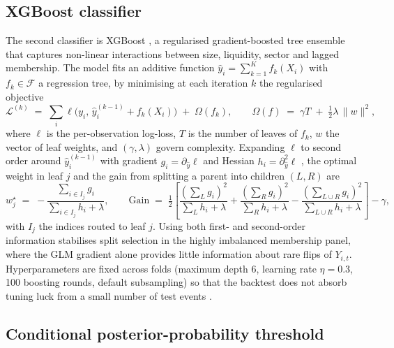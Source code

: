 \subsection{XGBoost classifier}

The second classifier is XGBoost \parencite{xgboost-a-scaleable-tree-boosting-system}, a regularised gradient-boosted tree ensemble that captures non-linear interactions between size, liquidity, sector and lagged membership. The model fits an additive function $\hat{y}_i=\sum_{k=1}^{K} f_k(X_i)$ with $f_k\in\mathcal{F}$ a regression tree, by minimising at each iteration $k$ the regularised objective
\begin{equation}
\mathcal{L}^{(k)} \;=\; \sum_{i}\ell\!\big(y_i,\,\hat{y}_i^{(k-1)}+f_k(X_i)\big) \;+\; \Omega(f_k),
\qquad
\Omega(f)\;=\;\gamma T \;+\; \tfrac{1}{2}\lambda\,\lVert w\rVert^{2},
\label{eq:xgb-obj}
\end{equation}
where $\ell$ is the per-observation log-loss, $T$ is the number of leaves of $f_k$, $w$ the vector of leaf weights, and $(\gamma,\lambda)$ govern complexity. Expanding $\ell$ to second order around $\hat{y}_i^{(k-1)}$ with gradient $g_i=\partial_{\hat{y}}\ell$ and Hessian $h_i=\partial^{2}_{\hat{y}}\ell$ \parencite{friedman-greedy-function-approximation,friedman-additive-logistic-regression}, the optimal weight in leaf $j$ and the gain from splitting a parent into children $(L,R)$ are
\begin{equation}
w_{j}^{\star} \;=\; -\frac{\sum_{i\in I_j} g_i}{\sum_{i\in I_j} h_i + \lambda},
\qquad
\mathrm{Gain} \;=\; \tfrac{1}{2}\!\left[\frac{(\sum_{L} g_i)^2}{\sum_{L} h_i + \lambda} + \frac{(\sum_{R} g_i)^2}{\sum_{R} h_i + \lambda} - \frac{(\sum_{L\cup R} g_i)^2}{\sum_{L\cup R} h_i + \lambda}\right] - \gamma,
\label{eq:xgb-leaf}
\end{equation}
with $I_j$ the indices routed to leaf $j$. Using both first- and second-order information stabilises split selection in the highly imbalanced membership panel, where the GLM gradient alone provides little information about rare flips of $Y_{i,t}$. Hyperparameters are fixed across folds (maximum depth 6, learning rate $\eta=0.3$, 100 boosting rounds, default subsampling) so that the backtest does not absorb tuning luck from a small number of test events \parencite{kaggle-xgboost-hyperparameter,dmlc-xgboost-hyperparameter}.

\subsection{Conditional posterior-probability threshold}

